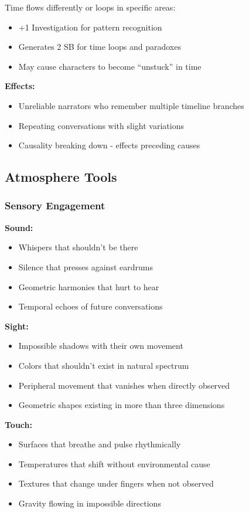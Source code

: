 \documentclass[11pt]{article}
\begin{document}
Time flows differently or loops in specific areas:
\begin{itemize}
\item +1 Investigation for pattern recognition
\item Generates 2 SB for time loops and paradoxes
\item May cause characters to become ``unstuck'' in time
\end{itemize}

\textbf{Effects:}
\begin{itemize}
\item Unreliable narrators who remember multiple timeline branches
\item Repeating conversations with slight variations
\item Causality breaking down - effects preceding causes
\end{itemize}

\subsection{Atmosphere Tools}

\subsubsection{Sensory Engagement}

\textbf{Sound:}
\begin{itemize}
\item Whispers that shouldn't be there
\item Silence that presses against eardrums
\item Geometric harmonies that hurt to hear
\item Temporal echoes of future conversations
\end{itemize}

\textbf{Sight:}
\begin{itemize}
\item Impossible shadows with their own movement
\item Colors that shouldn't exist in natural spectrum
\item Peripheral movement that vanishes when directly observed
\item Geometric shapes existing in more than three dimensions
\end{itemize}

\textbf{Touch:}
\begin{itemize}
\item Surfaces that breathe and pulse rhythmically
\item Temperatures that shift without environmental cause
\item Textures that change under fingers when not observed
\item Gravity flowing in impossible directions
\end{itemize}
\end{document}
